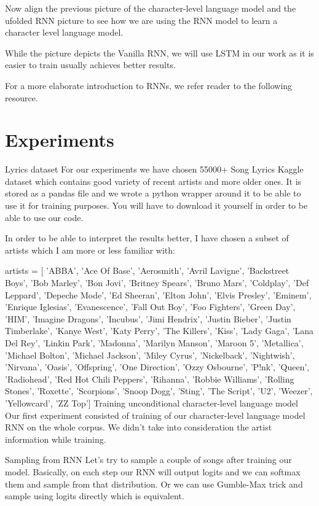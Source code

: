 \documentclass{article}
\begin{document}
Now align the previous picture of the character-level language model and the ufolded RNN picture to see how we are using the RNN model to learn a character level language model.

While the picture depicts the Vanilla RNN, we will use LSTM in our work as it is easier to train usually achieves better results.

For a more elaborate introduction to RNNs, we refer reader to the following resource.
\section{Experiments}
Lyrics dataset
For our experiments we have chosen 55000+ Song Lyrics Kaggle dataset which contains good variety of recent artists and more older ones. It is stored as a pandas file and we wrote a python wrapper around it to be able to use it for training purposes. You will have to download it yourself in order to be able to use our code.

In order to be able to interpret the results better, I have chosen a subset of artists which I am more or less familiar with:

artists = [
'ABBA',
'Ace Of Base',
'Aerosmith',
'Avril Lavigne',
'Backstreet Boys',
'Bob Marley',
'Bon Jovi',
'Britney Spears',
'Bruno Mars',
'Coldplay',
'Def Leppard',
'Depeche Mode',
'Ed Sheeran',
'Elton John',
'Elvis Presley',
'Eminem',
'Enrique Iglesias',
'Evanescence',
'Fall Out Boy',
'Foo Fighters',
'Green Day',
 'HIM',
 'Imagine Dragons',
 'Incubus',
 'Jimi Hendrix',
 'Justin Bieber',
 'Justin Timberlake',
'Kanye West',
 'Katy Perry',
 'The Killers',
 'Kiss',
 'Lady Gaga',
 'Lana Del Rey',
 'Linkin Park',
 'Madonna',
 'Marilyn Manson',
 'Maroon 5',
 'Metallica',
 'Michael Bolton',
 'Michael Jackson',
 'Miley Cyrus',
 'Nickelback',
 'Nightwish',
 'Nirvana',
 'Oasis',
 'Offspring',
 'One Direction',
 'Ozzy Osbourne',
 'P!nk',
 'Queen',
 'Radiohead',
 'Red Hot Chili Peppers',
 'Rihanna',
 'Robbie Williams',
 'Rolling Stones',
 'Roxette',
 'Scorpions',
 'Snoop Dogg',
 'Sting',
 'The Script',
 'U2',
 'Weezer',
 'Yellowcard',
 'ZZ Top']
Training unconditional character-level language model
Our first experiment consisted of training of our character-level language model RNN on the whole corpus. We didn’t take into consideration the artist information while training.\cite{DBLP:journals/corr/abs-1802-05577}

Sampling from RNN
Let’s try to sample a couple of songs after training our model. Basically, on each step our RNN will output logits and we can softmax them and sample from that distribution. Or we can use Gumble-Max trick and sample using logits directly which is equivalent.
\end{document}
